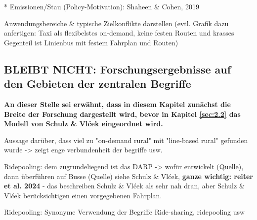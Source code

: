 * Emissionen/Stau (Policy-Motivation): Shaheen \& Cohen, 2019


Anwendungsbereiche \& typische Zielkonflikte darstellen (evtl. Grafik dazu anfertigen: Taxi als flexibelstes on-demand, keine festen Routen und krasses Gegenteil ist Linienbus mit festem Fahrplan und Routen)

\subsection{BLEIBT NICHT: Forschungsergebnisse auf den Gebieten der zentralen Begriffe}


\textbf{An dieser Stelle sei erwähnt, dass in diesem Kapitel zunächst die Breite der Forschung dargestellt wird, bevor in Kapitel \ref{sec:2.2} das Modell von Schulz \& Vlćek eingeordnet wird.}

Aussage darüber, dass viel zu "on-demand rural" mit "line-based rural" gefunden wurde -> zeigt enge verbundenheit der begriffe usw.


Ridepooling: dem zugrundeliegend ist das DARP -> wofür entwickelt (Quelle), dann überführen auf Busse (Quelle) siehe Schulz \& Vlćek, \textbf{ganze wichtig: reiter et al. 2024} - das beschreiben Schulz \& Vlćek als sehr nah dran, aber Schulz \& Vlćek berücksichtigen einen vorgegebenen Fahrplan. 

Ridepooling: Synonyme Verwendung der Begriffe Ride-sharing, ridepooling usw


